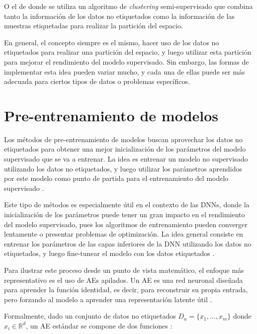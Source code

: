 O el de \citet{demiriz1999semi} donde se utiliza un algoritmo de \textit{clustering} semi-supervisado que combina tanto la información de los datos no etiquetados como la información de las muestras etiquetadas para realizar la partición del espacio.

En general, el concepto siempre es el mismo, hacer uso de los datos no etiquetados para realizar una partición del espacio, y luego utilizar esta partición para mejorar el rendimiento del modelo supervisado. Sin embargo, las formas de implementar esta idea pueden variar mucho, y cada una de ellas puede ser más adecuada para ciertos tipos de datos o problemas específicos.

\section{Pre-entrenamiento de modelos}
\label{sec:pre-training}

Los métodos de pre-entrenamiento de modelos buscan aprovechar los datos no etiquetados para obtener una mejor inicialización de los parámetros del modelo supervisado que se va a entrenar. La idea es entrenar un modelo no supervisado utilizando los datos no etiquetados, y luego utilizar los parámetros aprendidos por este modelo como punto de partida para el entrenamiento del modelo supervisado \cite{van2020survey}.

Este tipo de métodos es especialmente útil en el contexto de las \glspl{DNN}, donde la inicialización de los parámetros puede tener un gran impacto en el rendimiento del modelo supervisado, pues los algoritmos de entrenamiento pueden converger lentamente o presentar problemas de optimización. La idea general consiste en entrenar los parámetros de las capas inferiores de la \gls{DNN} utilizando los datos no etiquetados, y luego fine-tunear el modelo con los datos etiquetados \cite{hinton2006fast,vincent2008extracting}.

Para ilustrar este proceso desde un punto de vista matemático, el enfoque más representativo es el uso de \glspl{AE} apilados. Un \gls{AE} es una red neuronal diseñada para aprender la función identidad, es decir, para reconstruir su propia entrada, pero forzando al modelo a aprender una representación latente útil \cite{van2020survey}.

Formalmente, dado un conjunto de datos no etiquetados $D_u = \{x_1, \dots, x_m\}$ donde $x_i \in \mathbb{R}^d$, un \gls{AE} estándar se compone de dos funciones \cite{LI2023110176}:

